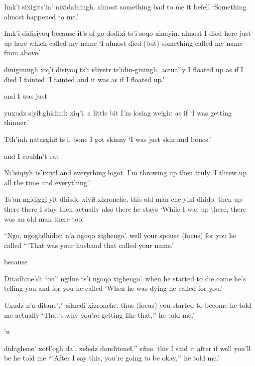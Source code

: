 \documentclass[12pt]{article}
\begin{document}
\gll Imk'i sixigits'in' nixidalningh.
almost {something bad to me}      {it befell}
\glt `Something almost happened to me.'
\glend

\gll Imk'i didisiyoq {because it's of} go dodixi ts'i {soqo xinayin}.
almost {I died} {} here {just up here} {} {which called my name}
\glt `I almost died (but) something called my name from above.'
\glend

 diniginingh xiq'i disiyoq ts'i {idiyetr tr'idin-giningh.}
actually {I floated up} {as if} {I died} {} {I fainted}
\glt `I fainted and it was as if I floated up.'
\glend

and I was just

 yuxudz {siyiɬ ghidinik} xiq'i.
{a little bit} {} {I'm losing weight} {as if}
\glt `I was getting thinner.'
\glend

\gll Tth'inh natasghiɬ ts'i.
bone   {I got skinny}
\glt `I was just skin and bones.'
\glend

and I couldn't eat 

\gll Ni'isiqiyh ts'ixiyiɬ {and everything} ɬogot. 
{I'm throwing up} then {} truly
\glt `I threw up all the time and everything.'
\glend

\gll Ts'an ngidiggi yit dhisdo xiyiɬ xizronche, {this old man} che yixi dhido.
then {up there} there {I stay} then   actually {} also there {he stays}
\glt `While I was up there, there was an old man there too.'
\glend

\gll ``Ngo, ngoghdhidon n'a ngoqo xighengo'. 
well {your spouse} {(focus)} {for you} {he called}
\glt ```That was your husband that called your name.'
\glend

because

\gll Ditadhine'di           ``on'' ngiɬne ts'i ngoqo xighengo'.
{when he started to die} come {he's telling you} and {for you} {he called}
\glt `When he was dying he called for you.'
\glend

\gll Uxudz n'a ditane','' siɬnedi xizronche.
thus {(focus)}     {you started to become} {he told me} actually
\glt `That's why you're getting like that,'' he told me.'
\glend

'n

 didaghsne'   xotl'ogh da', xeɬedz donditeneɬ,'' siɬne. 
this      {I said it}  after    if  well   {you'll be} {he told me} 
\glt ```After I say this, you're going to be okay,'' he told me.'
\glend
\end{document}
